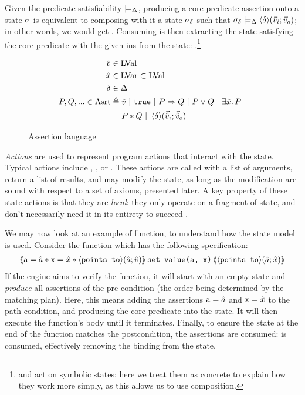 Given the predicate satisfiability $\models_{\Delta}$, producing a core predicate assertion \corepred{\delta}{\ins}{\outs} onto a state $\sigma$ is equivalent to composing with it a state $\sigma_\delta$ such that $\sigma_\delta\models_{\Delta}\left<\delta\right>\!(\vec{v}_i;\vec{v}_o)$; in other words, we would get \ppprod{\st,\delta,\ins,\outs}{\st\cdot\st_\delta}. Consuming is then extracting the state satisfying the core predicate with the given ins from the state: \ppcons{\st\cdot\st_\delta,\delta,\ins}{\Ok,\st,\outs}.\footnote{\consume{} and \produce{} act on symbolic states; here we treat them as concrete to explain how they work more simply, as this allows us to use composition.}

\begin{figure}
	\begin{align*}
	\hat{v} &\in \text{LVal}\\
	\hat{x} &\in \text{LVar} \subset \text{LVal}\\
	\delta &\in \Delta \\
	P, Q, ... \in \text{Asrt} &\triangleq \hat{v} ~|~ \texttt{true} ~|~ P \Rightarrow Q ~|~ P \lor Q ~|~ \exists \hat{x} \ldotp P ~|\\
	&\quad~ P * Q ~|~ \left<\delta\right>\!(\vec{\hat{v}}_i;\vec{\hat{v}}_o)
	\end{align*}
	\caption{Assertion language}
	\label{fig:assertion-language}
\end{figure}

\emph{Actions} are used to represent program actions that interact with the state. Typical actions include \load{}, \store{}, \alloc{} or \free. These actions are called with a list of arguments, return a list of results, and may modify the state, as long as the modification are sound with respect to a set of axioms, presented later. A key property of these state actions is that they are \emph{local}: they only operate on a fragment of state, and don't necessarily need it in its entirety to succeed \cite{abstractseplogic}.

We may now look at an example of function, to understand how the state model is used. Consider the function  which has the following specification:
\begin{align*}%
\ESLtriple
	{\code{a}=\sym a * \code{x} = \sym x * \corepred{\pointsto}{\sym a}{\sym v}}
	{set\_value(a, x)}
	{\corepred{\pointsto}{\sym a}{\sym x}}
\end{align*}%
If the engine aims to verify the function, it will start with an empty state and \emph{produce} all assertions of the pre-condition (the order being determined by the matching plan). Here, this means adding the assertions $\texttt{a} = \hat{a}$ and $\texttt{x} = \hat{x}$ to the path condition, and producing the core predicate  into the state. It will then execute the function's body until it terminates. Finally, to ensure the state at the end of the function matches the postcondition, the assertions are consumed:  is consumed, effectively removing the binding from the state. 

